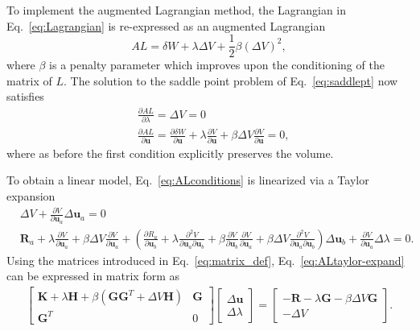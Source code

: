 \documentclass[12pt,aps,pre]{revtex4}
\begin{document}
To implement the augmented Lagrangian method, the Lagrangian in Eq.\ \eqref{eq:Lagrangian} is re-expressed as an augmented Lagrangian
%
\begin{equation}
AL = \delta W + \lambda \Delta V + \frac{1}{2}\beta(\Delta V)^2,
\label{eq:AugmentedLagrangian}
\end{equation}
%
where $\beta$ is a penalty parameter which improves upon the conditioning of the matrix of $L$. The solution to the saddle point problem of Eq.\ \eqref{eq:saddlept} now satisfies
%
\begin{equation}
\begin{aligned}
&\frac{\partial AL}{\partial \lambda} = \Delta V = 0 \\
&\frac{\partial AL}{\partial \pmb{u}} = \frac{\partial \delta W}{\partial \pmb{u}} + \lambda \frac{\partial V}{\partial \pmb{u}} + \beta \Delta V \frac{\partial V}{\partial \pmb{u}} = 0,
\end{aligned}
\label{eq:ALconditions}
\end{equation}
%
where as before the first condition explicitly preserves the volume.

To obtain a linear model, Eq.\ \eqref{eq:ALconditions} is linearized via a Taylor expansion
%
\begin{equation}
\begin{aligned}
&\Delta V + \frac{\partial V}{\partial  \pmb{u}_a} \Delta \pmb{u}_a = 0 \\
%
&\pmb{R}_a + \lambda \frac{\partial V}{\partial \pmb{u}_a} + \beta \Delta V \frac{\partial V}{\partial \pmb{u}_a}
%
+ \left(\frac{\partial R_a}{\partial \pmb{u}_b} + \lambda \frac{\partial^2 V}{\partial \pmb{u}_a \partial \pmb{u}_b} + \beta \frac{\partial V}{\partial \pmb{u}_b} \frac{\partial V}{\partial \pmb{u}_a} + \beta \Delta V \frac{\partial^2 V}{\partial \pmb{u}_a \partial \pmb{u}_b} \right) \Delta \pmb{u}_b 
%
+ \frac{\partial V}{\partial \pmb{u}_a} \Delta \lambda =0.
\end{aligned}
\label{eq:ALtaylor-expand}
\end{equation}
%
Using the matrices introduced in Eq.\ \eqref{eq:matrix_def}, Eq.\ \eqref{eq:ALtaylor-expand} can be expressed in matrix form as
%
\begin{eqnarray}
\begin{bmatrix}
\textbf{K} + \lambda \textbf{H} + \beta \left(\textbf{G} \textbf{G}^T + \Delta V \textbf{H} \right)& \textbf{G} \\
\textbf{G}^T & 0 
\end{bmatrix}
%
\begin{bmatrix}
\Delta \textbf{u} \\ \Delta \lambda
\end{bmatrix}
%
= \begin{bmatrix}
-\textbf{R}-\lambda \textbf{G} - \beta \Delta V \textbf{G} \\
- \Delta V 
\end{bmatrix}.
\label{eq:ALtaylor-expand_matrix}
\end{eqnarray}
%
\end{document}
